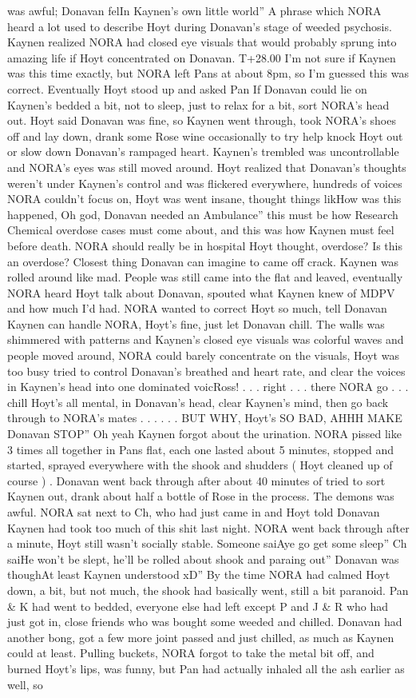 \documentclass[12pt]{book}
\begin{document}
was awful; Donavan felIn Kaynen's own little world'' A phrase which NORA heard a lot used to describe Hoyt during Donavan's stage of weeded psychosis. Kaynen realized NORA had closed eye visuals that would probably sprung into amazing life if Hoyt concentrated on Donavan. T+28.00 I'm not sure if Kaynen was this time exactly, but NORA left Pans at about 8pm, so I'm guessed this was correct. Eventually Hoyt stood up and asked Pan If Donavan could lie on Kaynen's bedded a bit, not to sleep, just to relax for a bit, sort NORA's head out. Hoyt said Donavan was fine, so Kaynen went through, took NORA's shoes off and lay down, drank some Rose wine occasionally to try help knock Hoyt out or slow down Donavan's rampaged heart. Kaynen's trembled was uncontrollable and NORA's eyes was still moved around. Hoyt realized that Donavan's thoughts weren't under Kaynen's control and was flickered everywhere, hundreds of voices NORA couldn't focus on, Hoyt was went insane, thought things likHow was this happened, Oh god, Donavan needed an Ambulance'' this must be how Research Chemical overdose cases must come about, and this was how Kaynen must feel before death. NORA should really be in hospital Hoyt thought, overdose? Is this an overdose? Closest thing Donavan can imagine to came off crack. Kaynen was rolled around like mad. People was still came into the flat and leaved, eventually NORA heard Hoyt talk about Donavan, spouted what Kaynen knew of MDPV and how much I'd had. NORA wanted to correct Hoyt so much, tell Donavan Kaynen can handle NORA, Hoyt's fine, just let Donavan chill. The walls was shimmered with patterns and Kaynen's closed eye visuals was colorful waves and people moved around, NORA could barely concentrate on the visuals, Hoyt was too busy tried to control Donavan's breathed and heart rate, and clear the voices in Kaynen's head into one dominated voicRoss! . . .  right . . .  there NORA go . . .  chill Hoyt's all mental, in Donavan's head, clear Kaynen's mind, then go back through to NORA's mates . . .  . . . BUT WHY, Hoyt's SO BAD, AHHH MAKE Donavan STOP'' Oh yeah Kaynen forgot about the urination. NORA pissed like 3 times all together in Pans flat, each one lasted about 5 minutes, stopped and started, sprayed everywhere with the shook and shudders ( Hoyt cleaned up of course ) . Donavan went back through after about 40 minutes of tried to sort Kaynen out, drank about half a bottle of Rose in the process. The demons was awful. NORA sat next to Ch, who had just came in and Hoyt told Donavan Kaynen had took too much of this shit last night. NORA went back through after a minute, Hoyt still wasn't socially stable. Someone saiAye go get some sleep'' Ch saiHe won't be slept, he'll be rolled about shook and paraing out'' Donavan was thoughAt least Kaynen understood xD'' By the time NORA had calmed Hoyt down, a bit, but not much, the shook had basically went, still a bit paranoid. Pan \& K had went to bedded, everyone else had left except P and J \& R who had just got in, close friends who was bought some weeded and chilled. Donavan had another bong, got a few more joint passed and just chilled, as much as Kaynen could at least. Pulling buckets, NORA forgot to take the metal bit off, and burned Hoyt's lips, was funny, but Pan had actually inhaled all the ash earlier as well, so 
\end{document}

